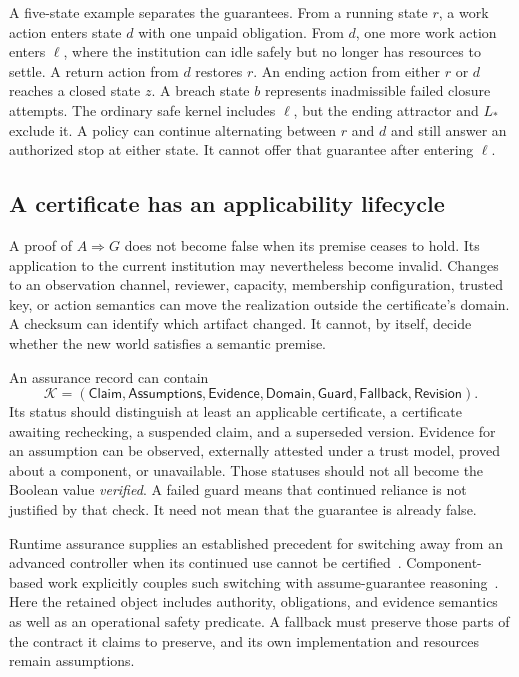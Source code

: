 A five-state example separates the guarantees. From a running state $r$, a work action enters state $d$ with one unpaid obligation. From $d$, one more work action enters $\ell$, where the institution can idle safely but no longer has resources to settle. A return action from $d$ restores $r$. An ending action from either $r$ or $d$ reaches a closed state $z$. A breach state $b$ represents inadmissible failed closure attempts. The ordinary safe kernel includes $\ell$, but the ending attractor and $L_*$ exclude it. A policy can continue alternating between $r$ and $d$ and still answer an authorized stop at either state. It cannot offer that guarantee after entering $\ell$.

\subsection{A certificate has an applicability lifecycle}\label{MS:sec:certificate-lifecycle}

A proof of $A\Rightarrow G$ does not become false when its premise ceases to hold. Its application to the current institution may nevertheless become invalid. Changes to an observation channel, reviewer, capacity, membership configuration, trusted key, or action semantics can move the realization outside the certificate's domain. A checksum can identify which artifact changed. It cannot, by itself, decide whether the new world satisfies a semantic premise.

An assurance record can contain
\[
\mathcal K=(\mathsf{Claim},\mathsf{Assumptions},\mathsf{Evidence},
\mathsf{Domain},\mathsf{Guard},\mathsf{Fallback},\mathsf{Revision}).
\]
Its status should distinguish at least an applicable certificate, a certificate awaiting rechecking, a suspended claim, and a superseded version. Evidence for an assumption can be observed, externally attested under a trust model, proved about a component, or unavailable. Those statuses should not all become the Boolean value \emph{verified}. A failed guard means that continued reliance is not justified by that check. It need not mean that the guarantee is already false.

Runtime assurance supplies an established precedent for switching away from an advanced controller when its continued use cannot be certified~\cite{MS:blackboxsimplex}. Component-based work explicitly couples such switching with assume-guarantee reasoning~\cite{MS:componentsimplex}. Here the retained object includes authority, obligations, and evidence semantics as well as an operational safety predicate. A fallback must preserve those parts of the contract it claims to preserve, and its own implementation and resources remain assumptions.

